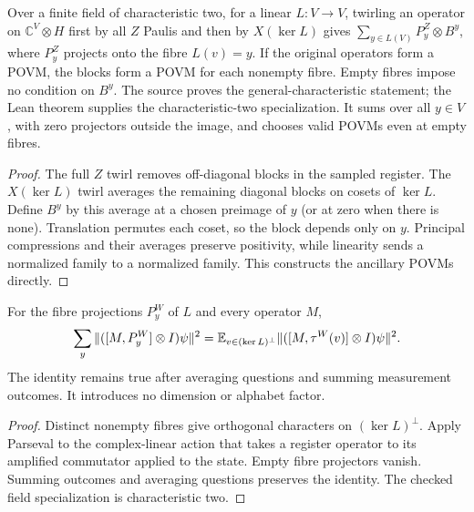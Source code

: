 \begin{lemma}
\label{lem:pauli-linear-mixing}
\leanok
Over a finite field of characteristic two, for a linear $L:V\to V$, twirling an operator on $\mathbb C^V\otimes H$
first by all $Z$ Paulis and then by $X(\ker L)$ gives
$\sum_{y\in L(V)}P_y^Z\otimes B^y$, where $P_y^Z$ projects onto the
fibre $L(v)=y$. If the original operators form a POVM, the blocks form a
POVM for each nonempty fibre. Empty fibres impose no condition on $B^y$.
The source proves the general-characteristic statement; the Lean theorem supplies
the characteristic-two specialization. It sums over all $y\in V$, with zero
projectors outside the image, and chooses valid POVMs even at empty fibres.
\end{lemma}
\begin{proof}
\leanok
The full $Z$ twirl removes off-diagonal blocks in the sampled register.
The $X(\ker L)$ twirl averages the remaining diagonal blocks on cosets of
$\ker L$. Define $B^y$ by this average at a chosen preimage of $y$ (or at
zero when there is none). Translation permutes each coset, so the block
depends only on $y$. Principal compressions and their averages preserve
positivity, while linearity sends a normalized family to a normalized
family. This constructs the ancillary POVMs directly.
\end{proof}

\begin{lemma}
\label{lem:pauli-commutator-transfer}
\leanok
For the fibre projections $P_y^W$ of $L$ and every operator $M$,
\[
 \sum_y\|([M,P_y^W]\otimes I)\psi\|^2
 =\mathbb E_{v\in(\ker L)^\perp}
       \|([M,\tau^W(v)]\otimes I)\psi\|^2.
\]
The identity remains true after averaging questions and summing measurement
outcomes. It introduces no dimension or alphabet factor.
\end{lemma}
\begin{proof}
\leanok
Distinct nonempty fibres give orthogonal characters on $(\ker L)^\perp$.
Apply Parseval to the complex-linear action that takes a register operator
to its amplified commutator applied to the state. Empty fibre projectors
vanish. Summing outcomes and averaging questions preserves the identity.
The checked field specialization is characteristic two.
\end{proof}

